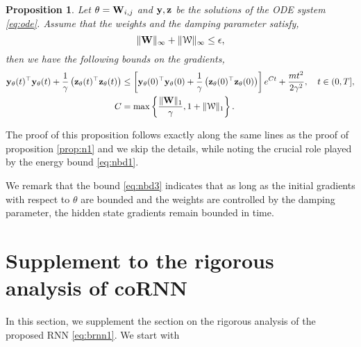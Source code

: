 \documentclass{article} \usepackage{iclr2021_conference,times}
\newtheorem{proposition}[theorem]{Proposition}
\newcommand{\cW}{\EuScript{W}}
\newcommand{\by}{{\bf y}}
\newcommand{\bz}{{\bf z}}
\newcommand{\bW}{{\bf W}}
\begin{document}
\begin{proposition}
\label{prop:n3_cont}
Let $\theta = \bW_{i,j}$ and $\by,\bz$ be the solutions of the ODE system \eqref{eq:ode}. Assume that the weights and the damping parameter satisfy, 
$$
\|\bW\|_{\infty} + \|\cW\|_{\infty} \leq \epsilon,
$$
then we have the following bounds on the gradients,
\begin{equation}
    \label{eq:nbd3}
    \begin{aligned}
    \by_{\theta}(t)^\top \by_{\theta}(t) + \frac{1}{\gamma}\left(\bz_{\theta}(t)^\top \bz_{\theta}(t)\right) &\leq \left[\by_{\theta}(0)^\top \by_{\theta}(0) + \frac{1}{\gamma}\left(\bz_{\theta}(0)^\top \bz_{\theta}(0)\right)\right]e^{Ct} + \frac{m t^2}{2\gamma^2},  
    \quad t \in (0,T], \\
    C &= \max\left\{ \frac{\|\bW\|_{1}}{\gamma}, 1 + \|\cW\|_{1}\right\}.
    \end{aligned}
\end{equation}
\end{proposition}
The proof of this proposition follows exactly along the same lines as the proof of proposition \ref{prop:n1} and we skip the details, while noting the crucial role played by the energy bound \eqref{eq:nbd1}. 

We remark that the bound \eqref{eq:nbd3} indicates that as long as the initial gradients with respect to $\theta$ are bounded and the weights are controlled by the damping parameter, the hidden state gradients remain bounded in time. 


\section{Supplement to the rigorous analysis of coRNN}
In this section, we supplement the section on the rigorous analysis of the proposed RNN \eqref{eq:brnn1}. We start with 
\end{document}
